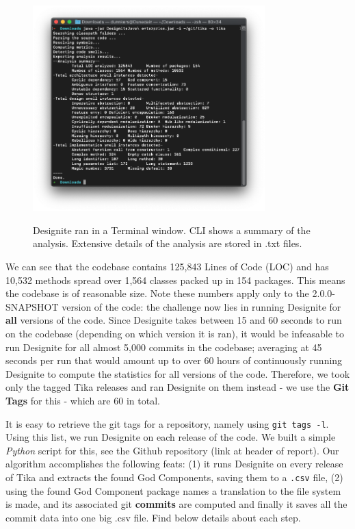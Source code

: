 \documentclass{article}
\begin{document}
\begin{figure}[ht]
    \centering
    \includegraphics[width=0.8\textwidth]{report/images/designite/cli_analysis.png}
    \label{fig:designite/cli_analysis}
    \caption{Designite ran in a Terminal window. CLI shows a summary of the analysis. Extensive details of the analysis are stored in .txt files.}
\end{figure}

We can see that the codebase contains 125,843 Lines of Code (LOC) and has 10,532 methods spread over 1,564 classes packed up in 154 packages. This means the codebase is of reasonable size. Note these numbers apply only to the 2.0.0-SNAPSHOT version of the code: the challenge now lies in running Designite for \textbf{all} versions of the code. Since Designite takes between 15 and 60 seconds to run on the codebase (depending on which version it is ran), it would be infeasable to run Designite for all almost 5,000 commits in the codebase; averaging at 45 seconds per run that would amount up to over 60 hours of continuously running Designite to compute the statistics for all versions of the code. Therefore, we took only the tagged Tika releases and ran Designite on them instead - we use the \textbf{Git Tags} for this - which are 60 in total.

It is easy to retrieve the git tags for a repository, namely using \texttt{git tags -l}. Using this list, we run Designite on each release of the code. We built a simple \textit{Python} script for this, see the Github repository (link at header of report). Our algorithm accomplishes the following feats: (1) it runs Designite on every release of Tika and extracts the found God Components, saving them to a \texttt{.csv} file, (2) using the found God Component package names a translation to the file system is made, and its associated git \textbf{commits} are computed and finally it saves all the commit data into one big .csv file. Find below details about each step.
\end{document}
